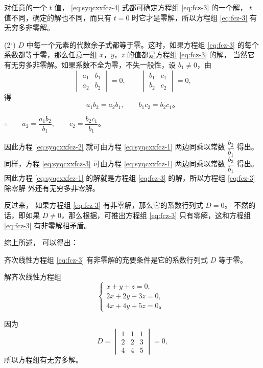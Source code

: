 对任意的一个 $t$ 值， \eqref{eq:syqcxxfcz-4} 式都可确定方程组 \eqref{eq:fcz-3} 的一个解，
$t$ 值不同，确定的解也不同，而只有 $t = 0$ 时它才是零解，所以方程组 \eqref{eq:fcz-3} 有无穷多非零解。


(2$^\circ$)  $D$ 中每一个元素的代数余子式都等于零。这时，如果方程组 \eqref{eq:fcz-3}
的每个系数都等于零，那么任意一组 $x$，$y$，$z$ 的值都是方程组 \eqref{eq:fcz-3} 的解，
当然它有无穷多非零解。如果系数不全为零，不失一般性，设 $b_1 \neq 0$，由
$$\begin{vmatrix*}
    a_1 & b_1 \\
    a_2 & b_2
\end{vmatrix*} = 0, \qquad
\begin{vmatrix*}
    b_1 & c_1 \\
    b_2 & c_2
\end{vmatrix*} = 0,
$$
得
$$a_1b_2 = a_2b_1, \qquad b_1c_2 = b_2c_1 \text{。}$$

$\therefore \qquad a_2 = \dfrac{a_1b_2}{b_1}, \qquad c_2 = \dfrac{b_2c_1}{b_1} \text{。}$

因此方程 \eqref{eq:syqcxxfcz-2} 就可由方程 \eqref{eq:syqcxxfcz-1} 两边同乘以常数 $\dfrac{b_2}{b_1}$ 得出。
同样，方程 \eqref{eq:syqcxxfcz-3} 可由方程 \eqref{eq:syqcxxfcz-1} 两边同乘以常数 $\dfrac{b_3}{b_1}$ 得出。
因此方程 \eqref{eq:syqcxxfcz-1} 的解就是方程组 \eqref{eq:fcz-3} 的解，所以方程组 \eqref{eq:fcz-3} 除零解
外还有无穷多非零解。

反过来， 如果方程组 \eqref{eq:fcz-3} 有非零解，那么它的系数行列式 $D = 0$。
不然的话，即如果 $D \neq 0$，那么根据，可推出方程组 \eqref{eq:fcz-3}
只有零解，这和方程组 \eqref{eq:fcz-3} 有非零解相矛盾。

综上所述， 可以得出：

\begin{theorem}\label{theorem:syqcxxfcz-1}
    齐次线性方程组 \eqref{eq:fcz-3} 有非零解的充要条件是它的系数行列式 $D$ 等于零。
\end{theorem}


\liti 解齐次线性方程组
$$\begin{cases}
    x + y + z = 0, \\
    2x + 2y + 3z = 0, \\
    4x + 4y + 5z = 0 \text{。}
\end{cases}$$

\jie 因为
$$D = \begin{vmatrix*}
	1 & 1 & 1 \\
	2 & 2 & 3 \\
	4 & 4 & 5
\end{vmatrix*} = 0,$$
所以方程组有无穷多解。

